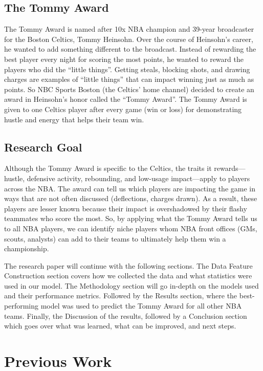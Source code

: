 \documentclass[11pt]{article}
\begin{document}
\subsection{The Tommy Award}
The Tommy Award is named after 10x NBA champion and 39-year broadcaster for the Boston Celtics, Tommy Heinsohn. Over the course of Heinsohn’s career, he wanted to add something different to the broadcast. Instead of rewarding the best player every night for scoring the most points, he wanted to reward the players who did the “little things”. Getting steals, blocking shots, and drawing charges are examples of “little things” that can impact winning just as much as points. So NBC Sports Boston (the Celtics' home channel) decided to create an award in Heinsohn’s honor called the “Tommy Award”. The Tommy Award is given to one Celtics player after every game (win or loss) for demonstrating hustle and energy that helps their team win.

\subsection{Research Goal}

Although the Tommy Award is specific to the Celtics, the traits it rewards---hustle, defensive activity, rebounding, and low-usage impact---apply to players across the NBA. The award can tell us which players are impacting the game in ways that are not often discussed (deflections, charges drawn). As a result, these players are lesser known because their impact is overshadowed by their flashy teammates who score the most. So, by applying what the Tommy Award tells us to all NBA players, we can identify niche players whom NBA front offices (GMs, scouts, analysts) can add to their teams to ultimately help them win a championship.

The research paper will continue with the following sections. The Data Feature Construction section covers how we collected the data and what statistics were used in our model. The Methodology section will go in-depth on the models used and their performance metrics. Followed by the Results section, where the best-performing model was used to predict the Tommy Award for all other NBA teams. Finally, the Discussion of the results, followed by a Conclusion section which goes over what was learned, what can be improved, and next steps.

\section{Previous Work}
\end{document}
